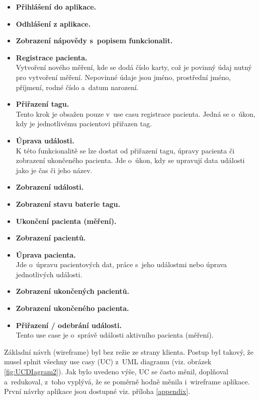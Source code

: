 \begin{itemize}
	\item \textbf{Přihlášení do aplikace.}
	\item \textbf{Odhlášení z aplikace.}
	\item \textbf{Zobrazení nápovědy s~popisem funkcionalit.}
	\item \textbf{Registrace pacienta.} \\
		Vytvoření nového měření, kde se dodá číslo karty, což je povinný údaj nutný pro vytvoření měření. Nepovinné údaje jsou jméno, prostřední jméno, příjmení, rodné číslo a~datum narození. 
	\item \textbf{Přiřazení tagu.} \\
		Tento krok je obsažen pouze v~use casu registrace pacienta. Jedná se o~úkon, kdy je jednotlivému pacientovi přiřazen tag.
	\item \textbf{Úprava události.} \\
		K této funkcionalitě se lze dostat od přiřazení tagu, úpravy pacienta či zobrazení ukončeného pacienta. Jde o~úkon, kdy se upravují data události jako je čas či jeho název.
	\item \textbf{Zobrazení události.} 
	\item \textbf{Zobrazení stavu baterie tagu.} 
	\item \textbf{Ukončení pacienta (měření).} 
	\item \textbf{Zobrazení pacientů.}
	\item \textbf{Úprava pacienta.} \\
		Jde o~úpravu pacientových dat, práce s~jeho událostmi nebo úprava jednotlivých události.
	\item \textbf{Zobrazení ukončených pacientů.} 
	\item \textbf{Zobrazení ukončeného pacienta.}
	\item \textbf{Přiřazení / odebrání události.} \\
		Tento use case je o~správě události aktivního pacienta (měření). \\
\end{itemize}


Základní návrh (wireframe) byl bez režie ze strany klienta. Postup byl takový, že musel splnit všechny use casy (UC) z~UML diagramu (viz. obrázek \ref{fig:UCDIagram2}). Jak bylo uvedeno výše, UC se často měnil, doplňoval a~redukoval, z~toho vyplývá, že se poměrně hodně měnila i~wireframe aplikace. První návrhy aplikace jsou dostupné viz. příloha \ref{appendix}.

